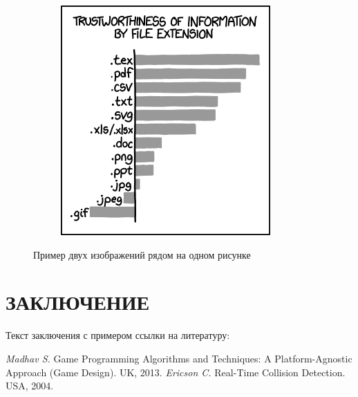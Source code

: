 \documentclass[intlimits,twoside,a4paper,11pt]{article}
\begin{document}
\begin{figure}[H]
\begin{subfigure}[t]{50mm}
		\includegraphics[width=\textwidth]{xkcd1301.png}
		\subcaption{} %
		\label{fig-example-2b}
	\end{subfigure}
	\caption{Пример двух изображений рядом на одном рисунке} \label{fig-example-2}
\end{figure}

\section{ЗАКЛЮЧЕНИЕ}
Текст заключения с примером ссылки на литературу:~\cite{lib-1,lib-2}

\begin{thebibliography}{9}
 {\it Madhav S.} Game Programming Algorithms and Techniques: A Platform-Agnostic Approach (Game Design). UK, 2013. 
 {\it Ericson C.} Real-Time Collision Detection. USA, 2004.
\end{thebibliography}

\end{document}
